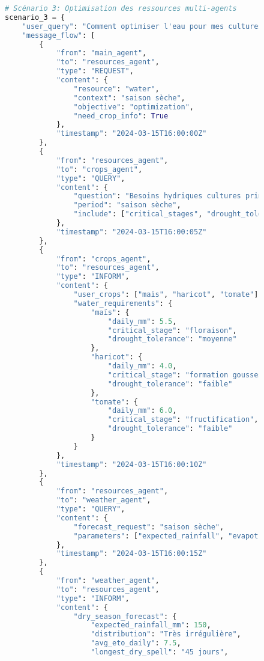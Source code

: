 \begin{figure}[H]
\begin{lstlisting}[language=Python, caption=Exemples de communications inter-agents en action]
# Scénario 3: Optimisation des ressources multi-agents
scenario_3 = {
    "user_query": "Comment optimiser l'eau pour mes cultures en saison sèche?",
    "message_flow": [
        {
            "from": "main_agent",
            "to": "resources_agent",
            "type": "REQUEST",
            "content": {
                "resource": "water",
                "context": "saison sèche",
                "objective": "optimization",
                "need_crop_info": True
            },
            "timestamp": "2024-03-15T16:00:00Z"
        },
        {
            "from": "resources_agent",
            "to": "crops_agent",
            "type": "QUERY",
            "content": {
                "question": "Besoins hydriques cultures principales utilisateur?",
                "period": "saison sèche",
                "include": ["critical_stages", "drought_tolerance"]
            },
            "timestamp": "2024-03-15T16:00:05Z"
        },
        {
            "from": "crops_agent",
            "to": "resources_agent",
            "type": "INFORM",
            "content": {
                "user_crops": ["maïs", "haricot", "tomate"],
                "water_requirements": {
                    "maïs": {
                        "daily_mm": 5.5,
                        "critical_stage": "floraison",
                        "drought_tolerance": "moyenne"
                    },
                    "haricot": {
                        "daily_mm": 4.0,
                        "critical_stage": "formation gousses",
                        "drought_tolerance": "faible"
                    },
                    "tomate": {
                        "daily_mm": 6.0,
                        "critical_stage": "fructification",
                        "drought_tolerance": "faible"
                    }
                }
            },
            "timestamp": "2024-03-15T16:00:10Z"
        },
        {
            "from": "resources_agent",
            "to": "weather_agent",
            "type": "QUERY",
            "content": {
                "forecast_request": "saison sèche",
                "parameters": ["expected_rainfall", "evapotranspiration", "dry_spell_duration"]
            },
            "timestamp": "2024-03-15T16:00:15Z"
        },
        {
            "from": "weather_agent",
            "to": "resources_agent",
            "type": "INFORM",
            "content": {
                "dry_season_forecast": {
                    "expected_rainfall_mm": 150,
                    "distribution": "Très irrégulière",
                    "avg_eto_daily": 7.5,
                    "longest_dry_spell": "45 jours",

\end{lstlisting}
\end{figure}

